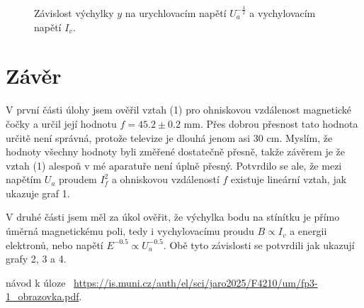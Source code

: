 \documentclass[a4paper,11pt]{article}
\begin{document}
\begin{figure}[H]
    \centering
    \resizebox{0.7\textwidth}{!}{  }
    \captionsetup{type=graph}
    \caption{Závislost výchylky $ y $ na urychlovacím napětí $ U_a^{-\frac{1}{2}} $ a vychylovacím napětí $ I_v $.    }
\end{figure}

\newpage

\section{Závěr}

 V první části úlohy jsem ověřil vztah (1) pro ohniskovou vzdálenost magnetické čočky a určil její hodnotu $ f = 45.2 \pm 0.2 $ mm. Přes dobrou přesnost tato hodnota určitě není správná, protože televize je dlouhá jenom asi 30 cm. Myslím, že hodnoty všechny hodnoty byli změřené dostatečně přesně, takže závěrem je že vztah (1) alespoň v mé aparatuře není úplně přesný. Potvrdilo se ale, že mezi napětím $ U_a $ proudem $ I_f^2 $ a ohniskovou vzdáleností $ f $  existuje lineární vztah, jak ukazuje graf 1. 

 V druhé části jsem měl za úkol ověřit, že výchylka bodu na stínítku je přímo úměrná magnetickému poli, tedy i vychylovacímu proudu $ B \propto I_v $ a energii elektronů, nebo napětí $ E^{-0.5} \propto U_a^{-0.5} $. Obě tyto závislosti se potvrdili jak ukazují grafy 2, 3 a 4.

\begin{thebibliography}{0}
 návod k úloze ~\url{https://is.muni.cz/auth/el/sci/jaro2025/F4210/um/fp3-1_obrazovka.pdf}.   
\end{thebibliography}
\end{document}
